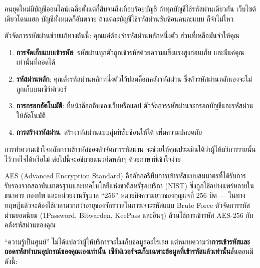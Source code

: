


คนยุคใหม่มีบัญชีออนไลน์เฉลี่ยตั้งแต่กี่สิบจนถึงเกือบร้อยบัญชี ถ้าทุกบัญชีใช้รหัสผ่านเดียวกัน เว็บไซต์เดียวโดนแฮก บัญชีทั้งหมดก็อันตราย ถ้าแต่ละบัญชีใช้รหัสผ่านซับซ้อนคนละแบบ ก็จำไม่ไหว

ตัวจัดการรหัสผ่านช่วยแก้ทางตันนี้: คุณแค่ต้องจำรหัสผ่านหลักหนึ่งตัว ส่วนที่เหลือมันจำให้คุณ


\begin{enumerate}
  \item \textbf{การจัดเก็บแบบเข้ารหัส}: รหัสผ่านทุกตัวถูกเข้ารหัสด้วยความแข็งแรงสูงก่อนเก็บ และมีแค่คุณเท่านั้นที่ถอดได้
  \item \textbf{รหัสผ่านหลัก}: คุณตั้งรหัสผ่านหลักหนึ่งตัวไว้ปลดล็อกคลังรหัสผ่าน ซึ่งตัวรหัสผ่านหลักเองจะไม่ถูกเก็บบนเซิร์ฟเวอร์
  \item \textbf{การกรอกอัตโนมัติ}: ที่หน้าล็อกอินของเว็บหรือแอป ตัวจัดการรหัสผ่านจะกรอกบัญชีและรหัสผ่านให้อัตโนมัติ
  \item \textbf{การสร้างรหัสผ่าน}: สร้างรหัสผ่านแบบสุ่มที่ซับซ้อนให้ได้ เพิ่มความปลอดภัย
\end{enumerate}


การทำความเข้าใจหลักการเข้ารหัสของตัวจัดการรหัสผ่าน จะช่วยให้คุณประเมินได้ว่าผู้ให้บริการรายนั้นไว้วางใจได้หรือไม่ ต่อไปนี้จะอธิบายแนวคิดหลักๆ ด้วยภาษาที่เข้าใจง่าย


AES (Advanced Encryption Standard) คืออัลกอริทึมการเข้ารหัสแบบสมมาตรที่ได้รับการรับรองจากสถาบันมาตรฐานและเทคโนโลยีแห่งชาติสหรัฐอเมริกา (NIST) ซึ่งถูกใช้อย่างแพร่หลายในธนาคาร กองทัพ และหน่วยงานรัฐบาล “256” หมายถึงความยาวของกุญแจที่ 256 บิต — ในทางทฤษฎีแล้วจะต้องใช้เวลามากกว่าอายุของจักรวาลในการเจาะรหัสแบบ Brute Force ตัวจัดการรหัสผ่านยอดนิยม (1Password, Bitwarden, KeePass และอื่นๆ) ล้วนใช้การเข้ารหัส AES-256 กับคลังรหัสผ่านของคุณ


“ความรู้เป็นศูนย์” ไม่ได้แปลว่าผู้ให้บริการจะไม่เก็บข้อมูลอะไรเลย แต่หมายความว่า\textbf{การเข้ารหัสและถอดรหัสทำบนอุปกรณ์ของคุณเองเท่านั้น เซิร์ฟเวอร์จะเก็บเฉพาะข้อมูลที่เข้ารหัสแล้วเท่านั้น}ขั้นตอนมีดังนี้:

